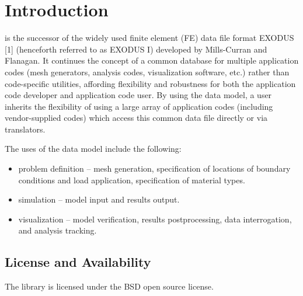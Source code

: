  \chapter{Introduction}

\exo{} is the successor of the widely used finite element
(FE) data file format EXODUS [1] (henceforth referred to as EXODUS I)
developed by Mills-Curran and Flanagan. It continues the concept of a
common database for multiple application codes (mesh generators,
analysis codes, visualization software, etc.) rather than
code-specific utilities, affording flexibility and robustness for both
the application code developer and application code user. By using the
\exo{} data model, a user inherits the flexibility of using a large
array of application codes (including vendor-supplied codes) which
access this common data file directly or via translators.

The uses of the \exo{} data model include the following:

\begin{itemize}
 \item problem definition -- mesh generation, specification
of locations of boundary conditions and load application, specification
of material types.
\item simulation -- model input and results output.
\item visualization -- model verification, results postprocessing,
data interrogation, and analysis tracking.
\end{itemize}

\section{License and Availability}
The \exo{} library is licensed under the BSD open source license.

